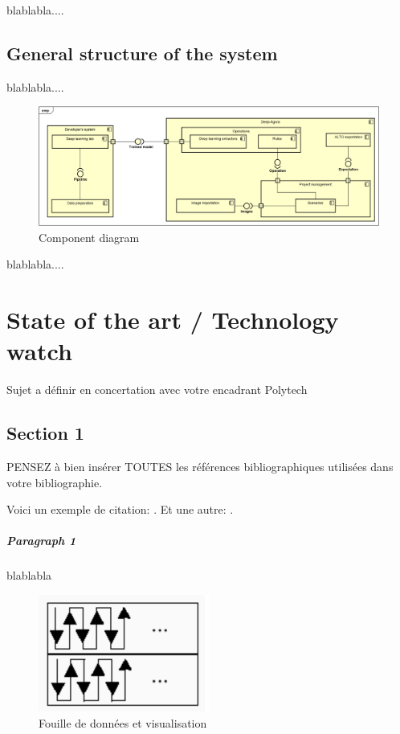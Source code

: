 \documentclass{polytech/polytech}
\numberwithin{figure}{chapter}
\begin{document}
blablabla....

\section{General structure of the system}

blablabla....

\begin{figure}[ht] 
    \centering 
    \includegraphics[width=\textwidth]{pic/20221116DiagComponent.png} 
    \caption{Component diagram}
    \label{diagComp}
\end{figure}

blablabla....

\chapter{State of the art / Technology watch}

Sujet a définir en concertation avec votre encadrant Polytech

\section{Section 1}

PENSEZ à bien insérer TOUTES les références bibliographiques
utilisées dans votre bibliographie.

Voici un exemple de citation: \cite{DBLP:journals/corr/abs-1804-02767}.
Et une autre: \linebreak \cite{DBLP:journals/corr/RedmonDGF15}.

\paragraph{Paragraph 1}

blablabla

\begin{figure}[ht] 
    \centering 
    \includegraphics[width=0.5\textwidth]{pic/barre.png} 
    \caption{Fouille de données et visualisation} 
    \label{fdv} 
\end{figure}
\end{document}
